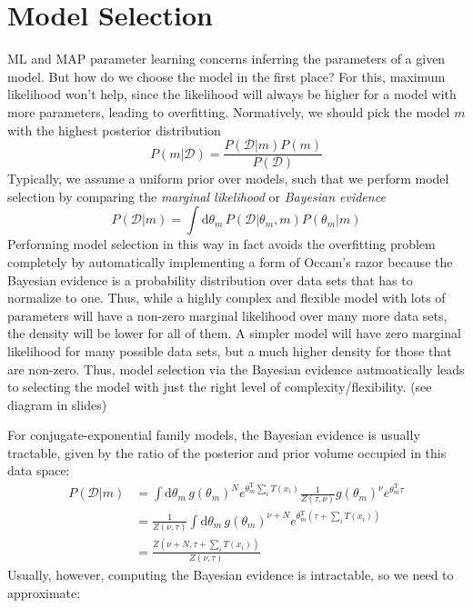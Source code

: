\documentclass[a4paper]{article}
\begin{document}
\section{Model Selection}
ML and MAP parameter learning concerns inferring the parameters of a given model. But how do we choose the model in the first place? For this, maximum likelihood won't help, since the likelihood will always be higher for a model with more parameters, leading to overfitting. Normatively, we should pick the model $m$ with the highest posterior distribution
\[ P(m|\mathcal{D}) = \frac{P(\mathcal{D}|m)P(m)}{P(\mathcal{D})} \]
Typically, we assume a uniform prior over models, such that we perform model selection by comparing the \emph{marginal likelihood} or \emph{Bayesian evidence} 
\[ P(\mathcal{D}|m) = \int\textrm{d}\theta_m\, P(\mathcal{D}|\theta_m, m)P(\theta_m|m) \] 
Performing model selection in this way in fact avoids the overfitting problem completely by automatically implementing a form of Occam's razor because the Bayesian evidence is a probability distribution over data sets that has to normalize to one. Thus, while a highly complex and flexible model with lots of parameters will have a non-zero marginal likelihood over many more data sets, the density will be lower for all of them. A simpler model will have zero marginal likelihood for many possible data sets, but a much higher density for those that are non-zero. Thus, model selection via the Bayesian evidence autmoatically leads to selecting the model with just the right level of complexity/flexibility. (see diagram in slides)

For conjugate-exponential family models, the Bayesian evidence is usually tractable, given by the ratio of the posterior and prior volume occupied in this data space:
\begin{align*}
P(\mathcal{D}|m) &= \int\textrm{d}\theta_m\, g(\theta_m)^Ne^{\theta_m^\textrm{T}\sum_iT(x_i)}\frac{1}{Z(\tau,\nu)}g(\theta_m)^\nu e^{\theta_m^\textrm{T}\tau} \\
&= \frac{1}{Z(\nu,\tau)}\int\textrm{d}\theta_m\, g(\theta_m)^{\nu+N} e^{\theta_m^\textrm{T}\left(\tau + \sum_iT(x_i)\right)} \\
&= \frac{Z\left(\nu+N,\tau+\sum_i T(x_i)\right)}{Z(\nu,\tau)}
\end{align*}
Usually, however, computing the Bayesian evidence is intractable, so we need to approximate:
\end{document}
